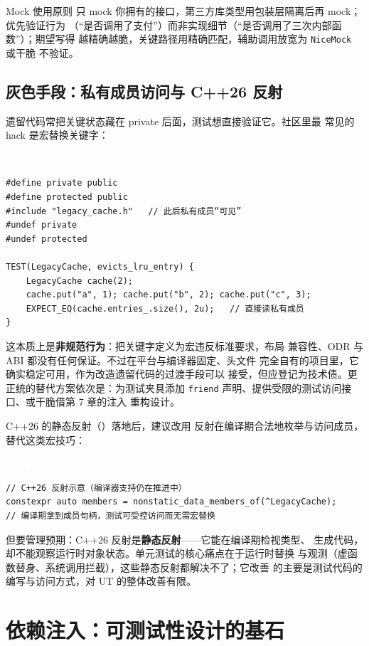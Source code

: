 \documentclass[12pt,a4paper,fontset=fandol]{ctexbook}
\newcommand{\cpplabel}{%
  \begin{tcolorbox}[enhanced,colback=cppheadbg,colframe=cppheadbg,
    arc=1mm,boxrule=0mm,left=6pt,right=6pt,top=2pt,bottom=2pt,
    halign=left,oversize]
    \textcolor{white}{\small\bfseries C++}
  \end{tcolorbox}\vspace{-4pt}}
\begin{document}
\begin{bestpractice}{Mock 使用原则}
只 mock 你拥有的接口，第三方库类型用包装层隔离后再 mock；优先验证行为
（“是否调用了支付”）而非实现细节（“是否调用了三次内部函数”）；期望写得
越精确越脆，关键路径用精确匹配，辅助调用放宽为 \texttt{NiceMock} 或干脆
不验证。
\end{bestpractice}

\section{灰色手段：私有成员访问与 C++26 反射}

遗留代码常把关键状态藏在 private 后面，测试想直接验证它。社区里最
常见的 hack 是宏替换关键字：

\cpplabel
\begin{lstlisting}
#define private public
#define protected public
#include "legacy_cache.h"   // 此后私有成员“可见”
#undef private
#undef protected

TEST(LegacyCache, evicts_lru_entry) {
    LegacyCache cache(2);
    cache.put("a", 1); cache.put("b", 2); cache.put("c", 3);
    EXPECT_EQ(cache.entries_.size(), 2u);   // 直接读私有成员
}
\end{lstlisting}

这本质上是\textbf{非规范行为}：把关键字定义为宏违反标准要求，布局
兼容性、ODR 与 ABI 都没有任何保证。不过在平台与编译器固定、头文件
完全自有的项目里，它确实稳定可用，作为改造遗留代码的过渡手段可以
接受，但应登记为技术债。更正统的替代方案依次是：为测试夹具添加
\texttt{friend} 声明、提供受限的测试访问接口、或干脆借第 7 章的注入
重构设计。

C++26 的静态反射（）落地后，建议改用
反射在编译期合法地枚举与访问成员，替代这类宏技巧：

\cpplabel
\begin{lstlisting}
// C++26 反射示意（编译器支持仍在推进中）
constexpr auto members = nonstatic_data_members_of(^LegacyCache);
// 编译期拿到成员句柄，测试可受控访问而无需宏替换
\end{lstlisting}

但要管理预期：C++26 反射是\textbf{静态反射}——它能在编译期检视类型、
生成代码，却不能观察运行时对象状态。单元测试的核心痛点在于运行时替换
与观测（虚函数替身、系统调用拦截），这些静态反射都解决不了；它改善
的主要是测试代码的编写与访问方式，对 UT 的整体改善有限。

\chapter{依赖注入：可测试性设计的基石}
\end{document}

